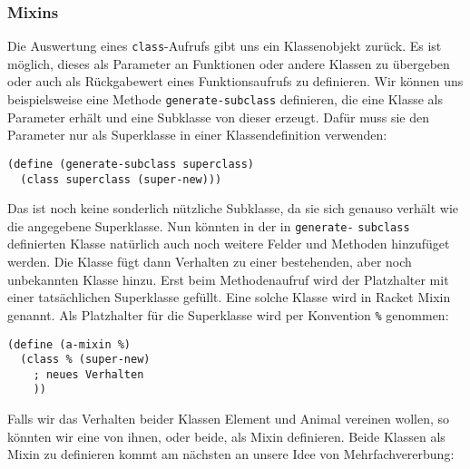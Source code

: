 \subsubsection{Mixins}
Die Auswertung eines \texttt{class}-Aufrufs gibt uns ein Klassenobjekt zurück. Es ist möglich, dieses als Parameter an Funktionen oder andere Klassen zu übergeben oder auch als Rückgabewert eines Funktionsaufrufs zu definieren. Wir können uns beispielsweise eine Methode \texttt{generate-subclass} definieren, die eine Klasse als Parameter erhält und eine Subklasse von dieser erzeugt. Dafür muss sie den Parameter nur als Superklasse in einer Klassendefinition verwenden:

\begin{lstlisting}
(define (generate-subclass superclass)
  (class superclass (super-new)))
\end{lstlisting} 

Das ist noch keine sonderlich nützliche Subklasse, da sie sich genauso verhält wie die angegebene Superklasse.
% 
% 
% 
% 
% 
Nun könnten in der in \texttt{generate-} \texttt{subclass} definierten Klasse natürlich auch noch weitere Felder und Methoden hinzufüget werden. Die Klasse fügt dann Verhalten zu einer bestehenden, aber noch unbekannten Klasse hinzu. Erst beim Methodenaufruf wird der Platzhalter mit einer tatsächlichen Superklasse gefüllt. Eine solche Klasse wird in Racket Mixin genannt. Als Platzhalter für die Superklasse wird per Konvention \texttt{\%} genommen:

\begin{lstlisting}
(define (a-mixin %)
  (class % (super-new)
    ; neues Verhalten
    ))
\end{lstlisting}

Falls wir das Verhalten beider Klassen Element und Animal vereinen wollen, so könnten wir eine von ihnen, oder beide, als Mixin definieren. Beide Klassen als Mixin zu definieren kommt am nächsten an unsere Idee von Mehrfachvererbung:

